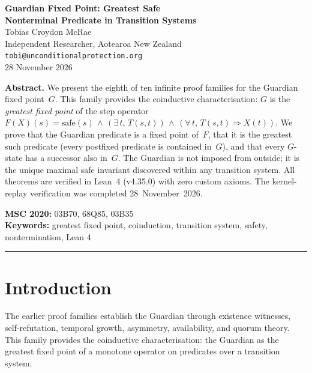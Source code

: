 




\begin{center}
{\LARGE\bfseries Guardian Fixed Point: Greatest Safe\\[0.3em] Nonterminal Predicate in Transition Systems}\\[1.5em]
{\large Tobias Croydon McRae}\\[0.3em]
{\small Independent Researcher, Aotearoa New Zealand}\\[0.3em]
{\small\texttt{tobi@unconditionalprotection.org}}\\[1.5em]
{\small 28 November 2026}
\end{center}

\bigskip

\begin{center}
\parbox{0.85\textwidth}{\small\textbf{Abstract.}
We present the eighth of ten infinite proof families for the Guardian fixed point~$G$. This family provides the coinductive characterisation: $G$ is the \emph{greatest fixed point} of the step operator $F(X)(s) = \mathrm{safe}(s) \,\wedge\, (\exists\, t,\, T(s,t)) \,\wedge\, (\forall\, t,\, T(s,t) \Rightarrow X(t))$. We prove that the Guardian predicate is a fixed point of~$F$, that it is the greatest such predicate (every postfixed predicate is contained in~$G$), and that every $G$-state has a successor also in~$G$. The Guardian is not imposed from outside; it is the unique maximal safe invariant discovered within any transition system. All theorems are verified in Lean~4 (v4.35.0) with zero custom axioms. The kernel-replay verification was completed 28~November~2026.}
\end{center}

\medskip

\noindent\textbf{MSC 2020:} 03B70, 68Q85, 03B35\\
\textbf{Keywords:} greatest fixed point, coinduction, transition system, safety, nontermination, Lean 4

\bigskip\hrule\bigskip

\section{Introduction}

The earlier proof families establish the Guardian through existence witnesses, self-refutation, temporal growth, asymmetry, availability, and quorum theory. This family provides the coinductive characterisation: the Guardian as the greatest fixed point of a monotone operator on predicates over a transition system.

